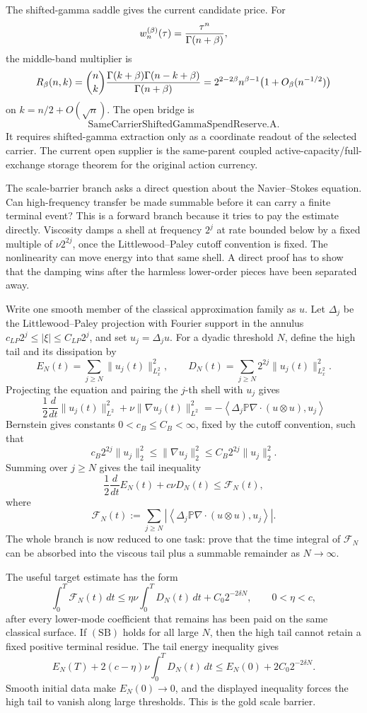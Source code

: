 The shifted-gamma saddle gives the current candidate price.  For
\[
  w_n^{(\beta)}(\tau)={\tau^n\over\Gamma(n+\beta)},
\]
the middle-band multiplier is
\[
  R_\beta(n,k)
  ={n\choose k}{\Gamma(k+\beta)\Gamma(n-k+\beta)\over\Gamma(n+\beta)}
  =2^{2-2\beta}n^{\beta-1}\bigl(1+O_\beta(n^{-1/2})\bigr)
\]
on \(k=n/2+O(\sqrt n)\).  The open bridge is
\[
  \text{SameCarrierShiftedGammaSpendReserve.A}.
\]
It requires shifted-gamma extraction only as a coordinate readout of the selected
carrier.  The current open supplier is the same-parent coupled
active-capacity/full-exchange storage theorem for the original action currency.

The scale-barrier branch asks a direct question about the Navier--Stokes
equation.  Can high-frequency transfer be made summable before it can carry a
finite terminal event?  This is a forward branch because it tries to pay the
estimate directly.  Viscosity damps a shell at frequency \(2^j\) at rate
bounded below by a fixed multiple of \(\nu2^{2j}\), once the
Littlewood--Paley cutoff convention is fixed.  The nonlinearity can move energy
into that same shell.  A direct proof has to show that the damping wins after
the harmless lower-order pieces have been separated away.

Write one smooth member of the classical approximation family as \(u\).  Let
\(\Delta_j\) be the Littlewood--Paley projection with Fourier support in the
annulus \(c_{LP}2^j\le |\xi|\le C_{LP}2^j\), and set \(u_j=\Delta_j u\).  For a
dyadic threshold \(N\), define the high tail and its dissipation by
\[
  E_N(t)=\sum_{j\ge N}\|u_j(t)\|_{L^2_x}^2,
  \qquad
  D_N(t)=\sum_{j\ge N}2^{2j}\|u_j(t)\|_{L^2_x}^2.
\]
Projecting the equation and pairing the \(j\)-th shell with \(u_j\) gives
\[
  \frac12\frac{d}{dt}\|u_j(t)\|_{L^2}^2
  +\nu\|\nabla u_j(t)\|_{L^2}^2
  =
  -\left\langle
  \Delta_j\mathbb P\nabla\cdot(u\otimes u),u_j
  \right\rangle
\]
Bernstein gives constants \(0<c_B\le C_B<\infty\), fixed by the cutoff
convention, such that
\[
  c_B2^{2j}\|u_j\|_2^2
  \le
  \|\nabla u_j\|_2^2
  \le
  C_B2^{2j}\|u_j\|_2^2.
\]
Summing over \(j\ge N\) gives the tail inequality
\[
  \frac12\frac{d}{dt}E_N(t)+c\nu D_N(t)
  \le \mathcal F_N(t),
\]
where
\[
  \mathcal F_N(t)
  :=
  \sum_{j\ge N}
  \left|
  \left\langle
  \Delta_j\mathbb P\nabla\cdot(u\otimes u),u_j
  \right\rangle
  \right|.
\]
The whole branch is now reduced to one task: prove that the time integral of
\(\mathcal F_N\) can be absorbed into the viscous tail plus a summable
remainder as \(N\to\infty\).

The useful target estimate has the form
\[
  \int_0^T \mathcal F_N(t)\,dt
  \le
  \eta\nu\int_0^TD_N(t)\,dt
  +C_0 2^{-2\delta N},
  \qquad 0<\eta<c,
  \tag{SB}
\]
after every lower-mode coefficient that remains has been paid on the same
classical surface.  If \((\mathrm{SB})\) holds for all large \(N\), then the
high tail cannot retain a fixed positive terminal residue.  The tail energy
inequality gives
\[
  E_N(T)+2(c-\eta)\nu\int_0^T D_N(t)\,dt
  \le
  E_N(0)+2C_0 2^{-2\delta N}.
\]
Smooth initial data make \(E_N(0)\to0\), and the displayed inequality forces
the high tail to vanish along large thresholds.  This is the gold scale
barrier.


